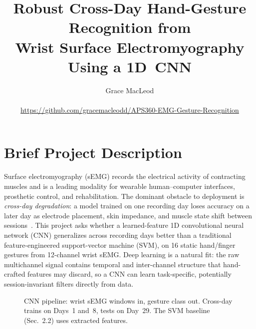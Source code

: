 \documentclass[final]{article}
\title{Robust Cross-Day Hand-Gesture Recognition from\\
Wrist Surface Electromyography Using a 1D~CNN}
\author{%
  Grace MacLeod \\
  \mbox{} \\
  \url{https://github.com/gracemacleodd/APS360-EMG-Gesture-Recognition}
}
\begin{document}
\maketitle
\vspace{-0.5in}

\section{Brief Project Description}

Surface electromyography (sEMG) records the electrical activity of contracting muscles and is a leading modality for wearable human--computer interfaces, prosthetic control, and rehabilitation. The dominant obstacle to deployment is \emph{cross-day degradation}: a model trained on one recording day loses accuracy on a later day as electrode placement, skin impedance, and muscle state shift between sessions~\citep{kaifosh2025}. This project asks whether a learned-feature 1D convolutional neural network (CNN) generalizes across recording days better than a traditional feature-engineered support-vector machine (SVM), on 16 static hand/finger gestures from 12-channel wrist sEMG. Deep learning is a natural fit: the raw multichannel signal contains temporal and inter-channel structure that hand-crafted features may discard, so a CNN can learn task-specific, potentially session-invariant filters directly from data.

\begin{figure}[!h]
  \centering
  \caption{CNN pipeline: wrist sEMG windows in, gesture class out. Cross-day trains on Days~1 and~8, tests on Day~29. The SVM baseline (Sec.~2.2) uses extracted features.}
  \label{fig:pipeline}
\end{figure}
\end{document}
